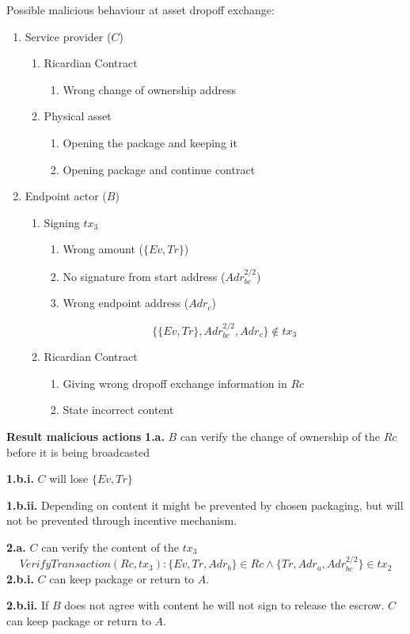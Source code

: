 Possible malicious behaviour at asset dropoff exchange:
\begin{enumerate}
  \item Service provider ($C$)
  \begin{enumerate}
    \item Ricardian Contract
    \begin{enumerate}
      \item Wrong change of ownership address
    \end{enumerate}
    \item Physical asset
    \begin{enumerate}
      \item Opening the package and keeping it
      \item Opening package and continue contract
    \end{enumerate}
  \end{enumerate}
  \item Endpoint actor ($B$)
  \begin{enumerate}
    \item Signing $tx_3$
    \begin{enumerate}
      \item Wrong amount ($\{Ev, Tr\}$)
      \item No signature from start address ($Adr_{bc}^{2/2}$)
      \item Wrong endpoint address ($Adr_c$)
    \end{enumerate}
    \[\{\{Ev, Tr\}, Adr_{bc}^{2/2}, Adr_c\}\not\in tx_3\]
    \item Ricardian Contract
    \begin{enumerate}
      \item Giving wrong dropoff exchange information in $Rc$
      \item State incorrect content
    \end{enumerate}
  \end{enumerate}
\end{enumerate}

\bigbreak
\noindent\textbf{Result malicious actions}
\bigbreak
\noindent\textbf{1.a.} $B$ can verify the change of ownership of the $Rc$ before it is being broadcasted \par
\noindent\textbf{1.b.i.} $C$ will lose $\{Ev, Tr\}$ \par
\noindent\textbf{1.b.ii.} Depending on content it might be prevented by chosen packaging, but will not be prevented through incentive mechanism. \par

\noindent\textbf{2.a.} $C$ can verify the content of the $tx_3$
\[VerifyTransaction(Rc, tx_3)\colon\{Ev, Tr, Adr_b\} \in Rc \land \{Tr, Adr_a, Adr_{bc}^{2/2}\} \in tx_2\]
\noindent\textbf{2.b.i.} $C$ can keep package or return to $A$.\par
\noindent\textbf{2.b.ii.} If $B$ does not agree with content he will not sign to release the escrow. $C$ can keep package or return to $A$.\par


